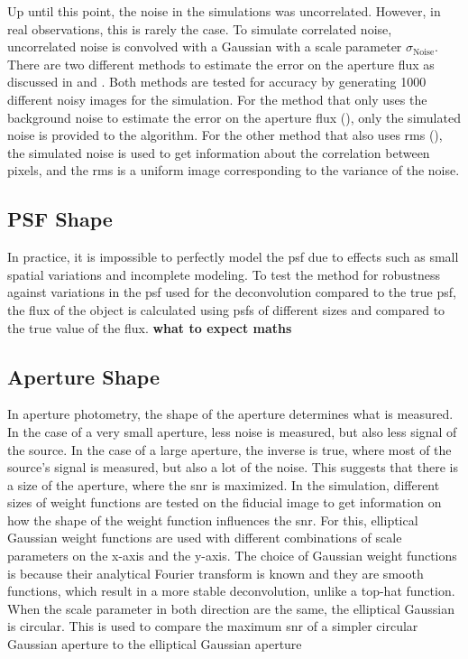 Up until this point, the noise in the simulations was uncorrelated. However, in real observations, this is rarely the case. To simulate correlated noise, uncorrelated noise is convolved with a Gaussian with a scale parameter $\sigma_\mathrm{Noise}$. There are two different methods to estimate the error on the aperture flux as discussed in  and . Both methods are tested for accuracy by generating 1000 different noisy images for the simulation. For the method that only uses the background noise to estimate the error on the aperture flux (), only the simulated noise is provided to the algorithm. For the other method that also uses \gls{rms} (), the simulated noise is used to get information about the correlation between pixels, and the \gls{rms} is a uniform image corresponding to the variance of the noise.

\subsection{PSF Shape}

In practice, it is impossible to perfectly model the \gls{psf} due to effects such as small spatial variations and incomplete modeling. To test the method for robustness against variations in the \gls{psf} used for the deconvolution compared to the true \gls{psf}, the flux of the object is calculated using \glspl{psf} of different sizes and compared to the true value of the flux.
\textbf{what to expect maths}


\subsection{Aperture Shape}

In aperture photometry, the shape of the aperture determines what is measured. In the case of a very small aperture, less noise is measured, but also less signal of the source. In the case of a large aperture, the inverse is true, where most of the source's signal is measured, but also a lot of the noise. This suggests that there is a size of the aperture, where the \gls{snr} is maximized. 
In the simulation, different sizes of weight functions are tested on the fiducial image to get information on how the shape of the weight function influences the \gls{snr}. For this, elliptical Gaussian weight functions are used with different combinations of scale parameters on the x-axis and the y-axis. The choice of Gaussian weight functions is because their analytical Fourier transform is known and they are smooth functions, which result in a more stable deconvolution, unlike a top-hat function. When the scale parameter in both direction are the same, the elliptical Gaussian is circular. This is used to compare the maximum \gls{snr} of a simpler circular Gaussian aperture to the elliptical Gaussian aperture

